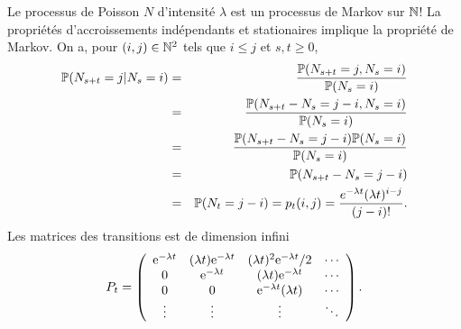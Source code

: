 \begin{ex}
Le processus de Poisson $N$ d'intensité $\lambda$ est un processus de Markov sur $\mathbb{N}$! La propriétés d'accroissements indépendants et stationaires implique la propriété de Markov. On a, pour $(i,j)\in \mathbb{N}^2$ tels que  $i\leq j$ et $s,t\geq 0$,
\begin{eqnarray*}
\mathbb{P}(N_{s+t} = j|N_s =i)&=&\frac{\mathbb{P}(N_{s+t} = j,N_s =i)}{\mathbb{P}(N_s =i)}\\
&=&\frac{\mathbb{P}(N_{s+t} - N_s = j-i, N_s =i)}{\mathbb{P}(N_s =i)}\\
&=&\frac{\mathbb{P}(N_{s+t} - N_s = j-i)\mathbb{P}(N_s =i)}{\mathbb{P}(N_s =i)}\\
&=&\mathbb{P}(N_{s+t} - N_s = j-i)\\
&=&\mathbb{P}(N_{t} = j-i) = p_t(i,j) = \frac{e^{-\lambda t}(\lambda t)^{i-j}}{(j-i)!}.\\
\end{eqnarray*} 
Les matrices des transitions est de dimension infini 
$$
P_t = \left(
\begin{array}{cccc}
\mathrm{e}^{-\lambda t}&(\lambda t)\mathrm{e}^{-\lambda t}&(\lambda t)^2\mathrm{e}^{-\lambda t}/2&\cdots\\
0&\mathrm{e}^{-\lambda t}&(\lambda t)\mathrm{e}^{-\lambda t}&\cdots\\
0&0&\mathrm{e}^{-\lambda t}(\lambda t)&\cdots\\
\vdots&\vdots&\vdots&\ddots
\end{array}
\right).
$$
\end{ex}
